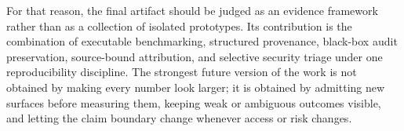 For that reason, the final artifact should be judged as an evidence framework rather than as a collection of isolated prototypes. Its contribution is the combination of executable benchmarking, structured provenance, black-box audit preservation, source-bound attribution, and selective security triage under one reproducibility discipline. The strongest future version of the work is not obtained by making every number look larger; it is obtained by admitting new surfaces before measuring them, keeping weak or ambiguous outcomes visible, and letting the claim boundary change whenever access or risk changes.
